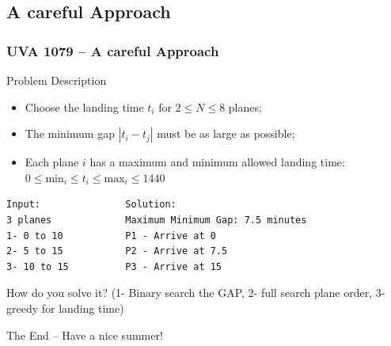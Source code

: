 \subsection{A careful Approach}
\begin{frame}[fragile]
  \frametitle{UVA 1079 -- A careful Approach}

  {\smaller
    \begin{block}{Problem Description}
      \begin{itemize}
      \item Choose the landing time $t_i$ for $2 \leq N \leq 8$ planes;
      \item The minimum gap $|t_i - t_j|$ must be as large as possible;
      \item Each plane $i$ has a maximum and minimum allowed landing time:\\
        $0 \leq \text{min}_i \leq t_i \leq \text{max}_i \leq 1440$
      \end{itemize}
    \end{block}

\begin{verbatim}
Input:               Solution:
3 planes             Maximum Minimum Gap: 7.5 minutes
1- 0 to 10           P1 - Arrive at 0
2- 5 to 15           P2 - Arrive at 7.5
3- 10 to 15          P3 - Arrive at 15
\end{verbatim}
  }

How do you solve it? (1- Binary search the GAP, 2- full search plane order, 3-greedy
for landing time)
\end{frame}

\begin{frame}

  \begin{center}
    The End -- Have a nice summer!
  \end{center}
\end{frame}
